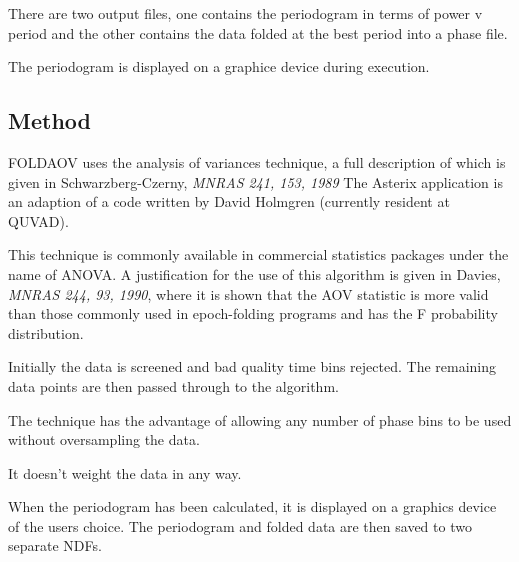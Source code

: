 \documentclass{book}
\renewcommand{\_}{{\tt\char'137}}     %
\begin{document}
There are two output files, one contains the periodogram in terms
of power v period and the other contains the data folded at the
best period into a phase file.

The periodogram is displayed on a graphice device during execution.

\subsection{Method}
FOLDAOV uses the analysis of variances technique, a full description
of which is given in Schwarzberg-Czerny, {\em MNRAS 241, 153, 1989}
The Asterix application is an adaption of a code written by David
Holmgren (currently resident at QUVAD).

This technique is commonly available in commercial statistics
packages under the name of ANOVA. A justification for the use
of this algorithm is given in Davies, {\em MNRAS 244, 93, 1990}, where
it is shown that the AOV statistic is more valid than those
commonly used in epoch-folding programs and has the F probability
distribution.

Initially the data is screened and bad quality time bins rejected.
The remaining data points are then passed through to the algorithm.

The technique has the advantage of allowing any number of phase
bins to be used without oversampling the data.

It doesn't weight the data in any way.

When the periodogram has been calculated, it is displayed on a
graphics device of the users choice. The periodogram and folded
data are then saved to two separate NDFs.
\end{document}
